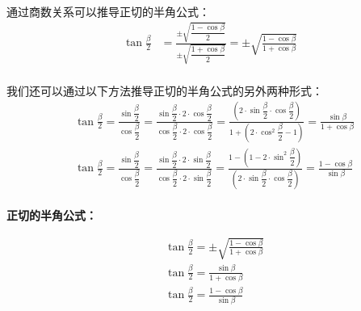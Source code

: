 \documentclass[UTF8]{ctexart}
\begin{document}
\newpage
    通过商数关系可以推导正切的半角公式：\\
    \begin{align}
        \tan{\frac{\beta}{2}}&=\frac{\pm\sqrt{\dfrac{1-\cos{\beta}}{2}}}{\pm\sqrt{\dfrac{1+\cos{\beta}}{2}}}
        =\pm\sqrt{\frac{1-\cos{\beta}}{1+\cos{\beta}}}
    \end{align}\\
    我们还可以通过以下方法推导正切的半角公式的另外两种形式：\\
    \begin{align}
        &\tan{\frac{\beta}{2}}
        =\frac{\sin{\dfrac{\beta}{2}}}{\cos{\dfrac{\beta}{2}}}
        =\frac{\sin{\dfrac{\beta}{2}}\cdot2\cdot\cos{\dfrac{\beta}{2}}}{\cos{\dfrac{\beta}{2}}\cdot2\cdot\cos{\dfrac{\beta}{2}}}
        =\frac{\left(2\cdot\sin{\dfrac{\beta}{2}}\cdot\cos{\dfrac{\beta}{2}}\right)}{1+\left(2\cdot\cos^2{\dfrac{\beta}{2}}-1\right)}
        =\frac{\sin{\beta}}{1+\cos{\beta}}\\[3mm]
        &\tan{\frac{\beta}{2}}
        =\frac{\sin{\dfrac{\beta}{2}}}{\cos{\dfrac{\beta}{2}}}
        =\frac{\sin{\dfrac{\beta}{2}}\cdot2\cdot\sin{\dfrac{\beta}{2}}}{\cos{\dfrac{\beta}{2}}\cdot2\cdot\sin{\dfrac{\beta}{2}}}
        =\frac{1-\left(1-2\cdot\sin^2{\dfrac{\beta}{2}}\right)}{\left(2\cdot\sin{\dfrac{\beta}{2}}\cdot\cos{\dfrac{\beta}{2}}\right)}
        =\frac{1-\cos{\beta}}{\sin{\beta}}
    \end{align}\\
    \newline
    \textbf{正切的半角公式：}
    \begin{large}
    \begin{align*}
        &\tan{\frac{\beta}{2}}=\pm\sqrt{\frac{1-\cos{\beta}}{1+\cos{\beta}}}\\[4mm]
        &\tan{\frac{\beta}{2}}=\frac{\sin{\beta}}{1+\cos{\beta}}\\[4mm]
        &\tan{\frac{\beta}{2}}=\frac{1-\cos{\beta}}{\sin{\beta}}
    \end{align*}
    \end{large}

\newpage
\end{document}
